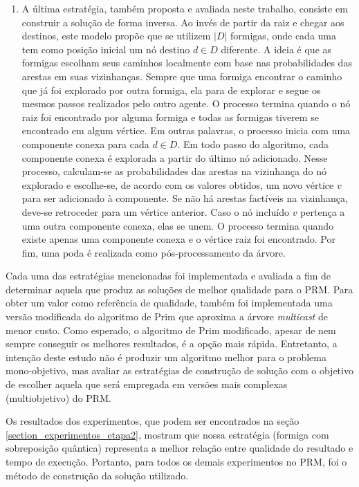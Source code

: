 \begin{enumerate}
	\item A última estratégia, também proposta e avaliada neste trabalho, consiste em construir a solução de forma inversa. Ao invés de partir da raiz e chegar aos destinos, este modelo propõe que se utilizem $|D|$ formigas, onde cada uma tem como posição inicial um nó destino $d \in D$ diferente. A ideia é que as formigas escolham seus caminhos localmente com base nas probabilidades das arestas em suas vizinhanças. Sempre que uma formiga encontrar o caminho que já foi explorado por outra formiga, ela para de explorar e segue os mesmos passos realizados pelo outro agente. O processo termina quando o nó raiz foi encontrado por alguma formiga e todas as formigas tiverem se encontrado em algum vértice. Em outras palavras, o processo inicia com uma componente conexa para cada $d \in D$. Em todo passo do algoritmo, cada componente conexa é explorada a partir do último nó adicionado. Nesse processo, calculam-se as probabilidades das arestas na vizinhança do nó explorado e escolhe-se, de acordo com os valores obtidos, um novo vértice $v$ para ser adicionado à componente. Se não há arestas factíveis na vizinhança, deve-se retroceder para um vértice anterior. Caso o nó incluído $v$ pertença a uma outra componente conexa, elas se unem. O processo termina quando existe apenas uma componente conexa e o vértice raiz foi encontrado. Por fim, uma poda é realizada como pós-processamento da árvore. 
\end{enumerate}

Cada uma das estratégias mencionadas foi implementada e avaliada a fim de determinar aquela que produz as soluções de melhor qualidade para o PRM. Para obter um valor como referência de qualidade, também foi implementada uma versão modificada do algoritmo de Prim \cite{Prim1957} que aproxima a árvore \textit{multicast} de menor custo. Como esperado, o algoritmo de Prim modificado, apesar de nem sempre conseguir os melhores resultados, é a opção mais rápida. Entretanto, a intenção deste estudo não é produzir um algoritmo melhor para o problema mono-objetivo, mas avaliar as estratégias de construção de solução com o objetivo de escolher aquela que será empregada em versões mais complexas (multiobjetivo) do PRM.

Os resultados dos experimentos, que podem ser encontrados na seção \ref{section_experimentos_etapa2}, mostram que nossa estratégia (formiga com sobreposição quântica) representa a melhor relação entre qualidade do resultado e tempo de execução. Portanto, para todos os demais experimentos no PRM, foi o método de construção da solução utilizado.

